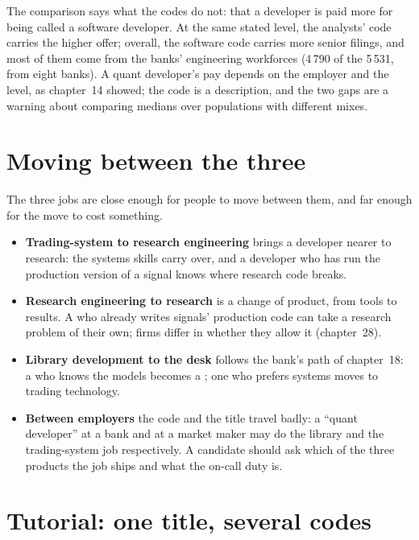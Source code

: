 The comparison says what the codes do not: that a developer is paid more for being called a software developer. At the
same stated level, the analysts' code carries the higher offer; overall, the software code carries more senior filings,
and most of them come from the banks' engineering workforces (4\,790 of the 5\,531, from eight banks). A quant developer's pay depends on the employer and
the level, as chapter~14 showed; the code is a description, and the two gaps are a warning about comparing medians over
populations with different mixes.

\section{Moving between the three}

The three jobs are close enough for people to move between them, and far enough for the move to cost something.
\begin{itemize}
\item \textbf{Trading-system to research engineering} brings a developer nearer to research: the systems skills carry
over, and a developer who has run the production version of a signal knows where research code breaks.
\item \textbf{Research engineering to research} is a change of product, from tools to results. A  who
already writes signals' production code can take a research problem of their own; firms differ in whether they allow it
(chapter~28).
\item \textbf{Library development to the desk} follows the bank's path of chapter~18: a  who knows the
models becomes a ; one who prefers systems moves to trading technology.
\item \textbf{Between employers} the code and the title travel badly: a ``quant developer'' at a bank and at a market
maker may do the library and the trading-system job respectively. A candidate should ask which of the three products the
job ships and what the on-call duty is.
\end{itemize}

\section{Tutorial: one title, several codes}\label{tut:in:quant-developer:tut}

